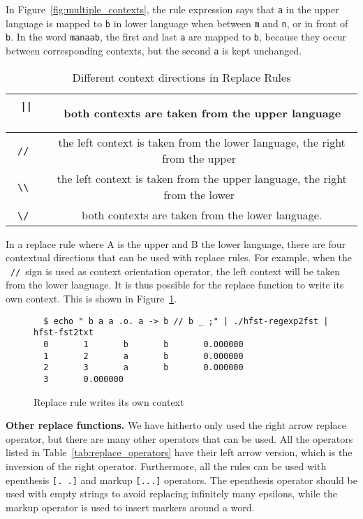 \documentclass{llncs}
\begin{document}
In Figure~\ref{fig:multiple_contexts}, the rule expression says that \verb!a! in the 
upper language is mapped to \verb!b! in lower language 
when between \verb!m! and \verb!n!, or in front of \verb!b!. 
In the word \verb!manaab!, the first and last \verb!a! are mapped to \verb!b!, 
because they occur between corresponding contexts, but the second \verb!a! is kept unchanged.


\begin{table} [h!]
  \centering
  \caption{Different context directions in Replace Rules}
  \begin{tabular}{ | c | c | }
    \hline
    \ \verb!||!\ & \ both contexts are taken from the upper language \\ \hline
    \ \verb!//!\ & \ the left context is taken from the lower language, the right from the upper \\ \hline
    \ \verb!\\!\ & \ the left context is taken from the upper language, the right from the lower \\ \hline
    \ \verb!\/!\ & \ both contexts are taken from the lower language. \\ \hline
  \end{tabular}
  \label{tab:context_directions}
\end{table}

In a replace rule where A is the upper and B the lower language, 
there are four contextual directions that can be used with replace rules.
For example, when the \ \verb!//!\ sign is used as context orientation operator, 
the left context will be taken from the lower language. 
It is thus possible for the replace function to write its own context. 
This is shown in Figure~\ref{fig:context_orientation}. 

\begin{figure} [h!]
{\footnotesize
\begin{verbatim}
  $ echo " b a a .o. a -> b // b _ ;" | ./hfst-regexp2fst | hfst-fst2txt
  0       1       b       b       0.000000
  1       2       a       b       0.000000
  2       3       a       b       0.000000
  3       0.000000
\end{verbatim}
}
\caption{Replace rule writes its own context}
\label{fig:context_orientation}
\end{figure}


\textbf{Other replace functions.} We have hitherto only used the right arrow replace operator,
but there are many other operators that can be used. 
All the operators listed in Table~\ref{tab:replace_operators} have their left arrow version, 
which is the inversion of the right operator. Furthermore, all the rules can be used 
with epenthesis \verb![. .]! and markup \verb![...]! operators. 
The epenthesis operator should be used with empty strings to avoid replacing infinitely 
many epsilons, while the markup operator is used to insert markers around a word.
\end{document}

